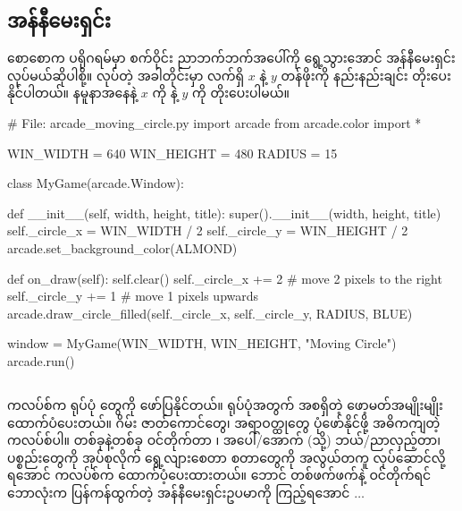 \subsection*{အန်နီမေးရှင်း}
စောစောက ပရိုဂရမ်မှာ စက်ဝိုင်း ညာဘက်ဘက်အပေါ်ကို ရွေ့သွားအောင် အန်နီမေးရှင်း လုပ်မယ်ဆိုပါစို့။  လုပ်တဲ့ အခါတိုင်းမှာ လက်ရှိ $x$ နဲ့ $y$ တန်ဖိုးကို နည်းနည်းချင်း တိုးပေးနိုင်ပါတယ်။ နမူနာအနေနဲ့ $x$ ကို  နဲ့ $y$ ကို  တိုးပေးပါမယ်။
%
\begin{py}
# File: arcade_moving_circle.py
import arcade
from arcade.color import *

WIN_WIDTH = 640
WIN_HEIGHT = 480
RADIUS = 15


class MyGame(arcade.Window):

    def __init__(self, width, height, title):
        super().__init__(width, height, title)
        self._circle_x = WIN_WIDTH / 2
        self._circle_y = WIN_HEIGHT / 2
        arcade.set_background_color(ALMOND)

    def on_draw(self):
        self.clear()
        self._circle_x += 2     # move 2 pixels to the right
        self._circle_y += 1     # move 1 pixels upwards
        arcade.draw_circle_filled(self._circle_x,
                                  self._circle_y,
                                  RADIUS,
                                  BLUE)


window = MyGame(WIN_WIDTH, WIN_HEIGHT, "Moving Circle")
arcade.run()
\end{py}
%


\subsection*{}
 ကလပ်စ်က ရုပ်ပုံ  တွေကို ဖော်ပြနိုင်တယ်။ ရုပ်ပုံအတွက်  အစရှိတဲ့  ဖော့မတ်အမျိုးမျိုး ထောက်ပံပေးတယ်။ ဂိမ်း ဇာတ်ကောင်တွေ၊ အရာဝတ္ထုတွေ ပုံဖော်နိုင်ဖို့ အဓိကကျတဲ့ ကလပ်စ်ပါ။ တစ်ခုနဲ့တစ်ခု ဝင်တိုက်တာ  ၊  အပေါ်/အောက် (သို့) ဘယ်/ညာလှည့်တာ၊  ပစ္စည်းတွေကို အုပ်စုလိုက် ရွေ့လျားစေတာ စတာတွေကို အလွယ်တကူ လုပ်ဆောင်လို့ရအောင်  ကလပ်စ်က ထောက်ပံ့ပေးထားတယ်။  ဘောင် တစ်ဖက်ဖက်နဲ့ ဝင်တိုက်ရင် ဘောလုံးက ပြန်ကန်ထွက်တဲ့ အန်နီမေးရှင်းဥပမာကို ကြည့်ရအောင် $\ldots$

